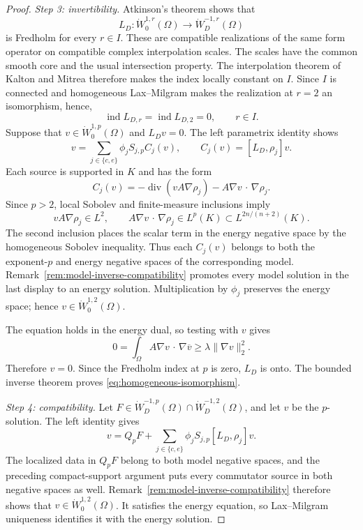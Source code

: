 \documentclass[12pt]{amsart}
\newcommand{\cdo}{\, \cdot \,}
\newcommand{\diver}{\operatorname{div}}
\theoremstyle{remark}
\begin{document}
\begin{proof}
\emph{Step 3: invertibility.}
Atkinson's theorem \cite{Atkinson51} shows that
\[
 L_D:\dot W^{1,r}_0(\Omega)\longrightarrow\dot W^{-1,r}_D(\Omega)
\]
is Fredholm for every \(r\in I\).  These are compatible realizations of
the same form operator on compatible complex interpolation scales.  The
scales have the common smooth core and the usual intersection property.
The interpolation theorem of Kalton and Mitrea \cite[Theorem~2.9]{KaltonMitrea98} therefore makes the index locally constant on \(I\).  Since \(I\) is connected and homogeneous
Lax--Milgram makes the realization at \(r=2\) an isomorphism, hence,
\[
 \operatorname{ind}L_{D,r}=\operatorname{ind}L_{D,2}=0,
 \qquad r\in I.
\]
Suppose that \(v\in\dot W^{1,p}_0(\Omega)\) and \(L_Dv=0\).  The left
parametrix identity shows
\[
 v=\sum_{j\in\{c,e\}}\phi_jS_{j,p}C_j(v),
 \qquad C_j(v)=[L_D,\rho_j]v.
\]
Each source is supported in $K$ and has the form
\[
 C_j(v)=-\diver(vA\nabla\rho_j)
         -A\nabla v\mathbin{\cdo}\nabla\rho_j.
\]
Since \(p>2\), local Sobolev and finite-measure inclusions imply
\[
 vA\nabla\rho_j\in L^2,
 \qquad
 A\nabla v\mathbin{\cdo}\nabla\rho_j
 \in L^p(K)\subset L^{2n/(n+2)}(K).
\]
The second inclusion places the scalar term in the energy negative space
by the homogeneous Sobolev inequality.  Thus each \(C_j(v)\) belongs to
both the exponent-\(p\) and energy negative spaces of the corresponding
model.  Remark~\ref{rem:model-inverse-compatibility} promotes every model
solution in the last display to an energy solution.  Multiplication by
\(\phi_j\) preserves the energy space; hence
\(v\in\dot W^{1,2}_0(\Omega)\).

The equation holds in the energy dual, so testing with \(v\) gives
\[
 0=\int_\Omega
 A\nabla v\mathbin{\cdo}\nabla\overline v
 \geq\lambda\|\nabla v\|_2^2.
\]
Therefore \(v=0\).  Since the Fredholm index at \(p\) is zero, \(L_D\) is onto.  The bounded inverse theorem
proves \eqref{eq:homogeneous-isomorphism}.

\emph{Step 4: compatibility.}
Let
\(F\in\dot W^{-1,p}_D(\Omega)\cap\dot W^{-1,2}_D(\Omega)\), and let \(v\)
be the \(p\)-solution.  The left identity gives
\[
 v=Q_pF+
 \sum_{j\in\{c,e\}}\phi_jS_{j,p}[L_D,\rho_j]v.
\]
The localized data in \(Q_pF\) belong to both model negative spaces, and
the preceding compact-support argument puts every commutator source in
both negative spaces as well.  Remark~\ref{rem:model-inverse-compatibility}
therefore shows that \(v\in\dot W^{1,2}_0(\Omega)\).  It satisfies the
energy equation, so Lax--Milgram uniqueness identifies it with the energy
solution.
\end{proof}
\end{document}

